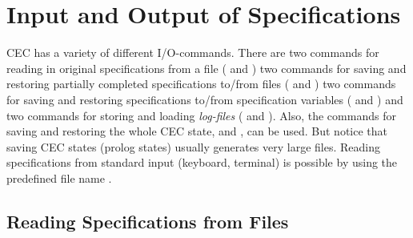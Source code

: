 
\section{Input and Output of Specifications}
\label{InputOutput}

CEC has a variety of different I/O-commands. There are two commands for reading in
original specifications from a file ( and )
two commands for saving and restoring partially completed specifications 
to/from files ( and )
two commands for saving and restoring specifications to/from 
specification variables ( and ) and
two commands for storing and loading {\em log-files}
( and ).
Also, the commands for saving and 
restoring the whole CEC state,  and , can be used. But
notice that saving CEC states (prolog states) usually generates very
large files. 
Reading specifications from standard input
(keyboard, terminal) is possible by using the predefined file name .


\subsection{Reading Specifications from Files}
\label{InCommand}

